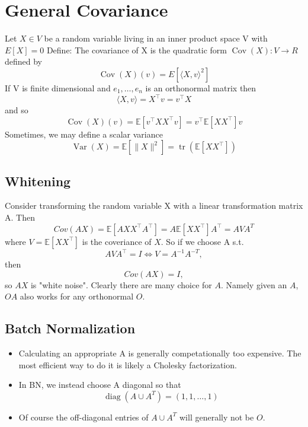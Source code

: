 \section{General Covariance}
Let $X \in V$ be a random variable living in an inner product space V with $E\left[ X\right] = 0$\newline
Define: The covariance of X is the quadratic form  $\operatorname{Cov}(X): V \rightarrow R $ defined by
$$
\operatorname{Cov}(X)(v)=E\left[\langle X, v\rangle^{2}\right]
$$ 
If V is finite dimensional and $e_{1}, \dots, e_{n}$ is an orthonormal matrix then
$$
\langle X, v\rangle=X^{\top} v=v^{\top} X
$$ and so 
$$
\operatorname{Cov}(X)(v)=\mathbb{E}\left[v^{\top} X X^{\top} v\right]=v^{\top} \mathbb{E}\left[X X^{\top}\right] v
$$ 
Sometimes, we may define a scalar variance \newline
$$
\operatorname{Var}(X)=\mathbb{E}\left[\|X\|^{2}\right]=\operatorname{tr}\left(\mathbb{E}\left[X X^{\top}\right]\right)
$$


\subsection{Whitening}
Consider transforming the random variable X with a linear transformation matrix A. Then \newline
$$
Cov(A X)=\mathbb{E}\left[AXX^{\top} A^{\top}\right]=A \mathbb{E}\left[X X^{\top}\right] A^{\top}=A V A^{T}
$$
where $V= \mathbb{E}\left[X X^{\top}\right]$ is the coveriance of $X$. 
So if we choose A s.t. \newline
$$
A VA^{\top}=I \Leftrightarrow V=A^{-1} A^{-T},
$$
then 
$$
Cov(A X)= I,
$$ 
so $AX$ is "white noise".
Clearly there are many choice for $A$. Namely given an $A$, $OA$ also works for any orthonormal $O$.


\subsection{Batch Normalization}
\begin{itemize}
\item Calculating an appropriate A is generally competationally too expensive. The most efficient way to do it is likely a Cholesky factorization.
\item In BN, we instead choose A diagonal so that 
$$
\operatorname{diag}\left(A \cup A^{T}\right)=(1,1, \ldots, 1)
$$
\item Of course the off-diagonal entries of $A \cup A^{T}$ will generally not be $O$.
\end{itemize}


